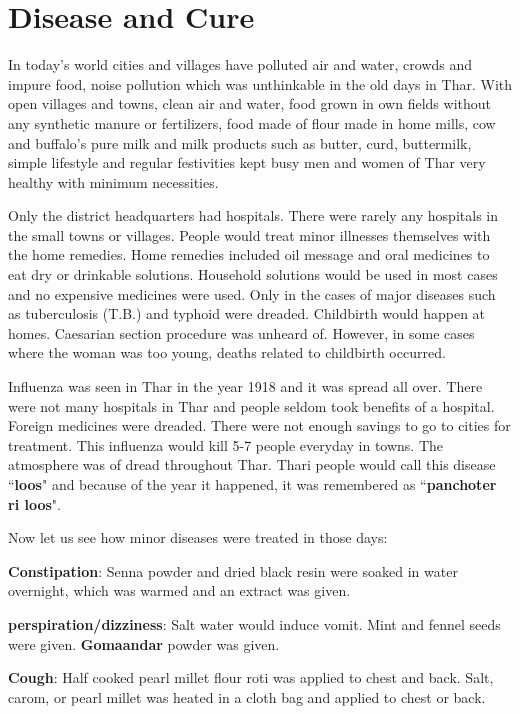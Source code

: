 \chapter{Disease and Cure}
In today's world cities and villages have polluted air and water, crowds and
impure food, noise pollution which was unthinkable in the old days in Thar.
With open villages and towns, clean air and water, food grown in own fields
without any synthetic manure or fertilizers, food made of flour made in home
mills, cow and buffalo's pure milk and milk products such as butter, curd,
buttermilk, simple lifestyle and regular festivities kept busy men and women of
Thar very healthy with minimum necessities.

Only the district headquarters had hospitals. There were rarely any hospitals
in the small towns or villages. People would treat minor illnesses themselves
with the home remedies. Home remedies included oil message and oral medicines
to eat dry or drinkable solutions. Household solutions would be used in most
cases and no expensive medicines were used. Only in the cases of major diseases
such as tuberculosis (T.B.) and typhoid were dreaded. Childbirth would happen
at homes. Caesarian section procedure was unheard of. However, in some cases
where the woman was too young, deaths related to childbirth occurred.

Influenza was seen in Thar in the year 1918 and it was spread all over. There
were not many hospitals in Thar and people seldom took benefits of a hospital.
Foreign medicines were dreaded. There were not enough savings to go to cities
for treatment. This influenza would kill 5-7 people everyday in towns. The
    atmosphere was of dread throughout Thar. Thari people would call this
    disease ``\textbf{loos}" and because of the year it happened, it was
    remembered as ``\textbf{panchoter ri loos}". 

Now let us see how minor diseases were treated in those days:

\textbf{Constipation}: Senna powder and dried black resin were soaked in water
overnight, which was warmed and an extract was given.

\textbf{perspiration/dizziness}: Salt water would induce vomit. Mint and fennel
seeds were given. \textbf{Gomaandar} powder was given.

\textbf{Cough}: Half cooked pearl millet flour roti was applied to chest and
back. Salt, carom, or pearl millet was heated in a cloth bag and applied to
chest or back.

